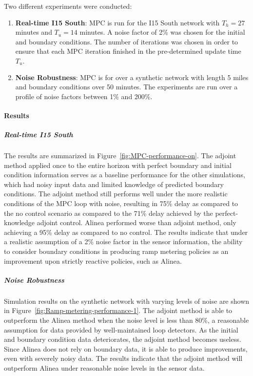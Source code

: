 Two different experiments were conducted:
\begin{enumerate}
\item \textbf{Real-time I15 South}: MPC is run for the I15 South network
with $T_{h}=27$ minutes and $T_{u}=14$ minutes. A noise factor of
2\% was chosen for the initial and boundary conditions. The number
of iterations was chosen in order to ensure that each MPC iteration
finished in the pre-determined update time $T_{u}$.
\item \textbf{Noise Robustness}: MPC is for over a synthetic network with
length 5 miles and boundary conditions over 50 minutes. The experiments
are run over a profile of noise factors between 1\% and 200\%.
\end{enumerate}

\paragraph{Results}


\subparagraph{Real-time I15 South}

The results are summarized in Figure~\ref{fig:MPC-performance-on}.
The adjoint method applied once to the entire horizon with perfect
boundary and initial condition information serves as a baseline performance
for the other simulations, which had noisy input data and limited
knowledge of predicted boundary conditions. The adjoint method still
performs well under the more realistic conditions of the MPC loop
with noise, resulting in 75\% delay as compared to the no control
scenario as compared to the 71\% delay achieved by the perfect-knowledge
adjoint control. Alinea performed worse than adjoint method, only
achieving a 95\% delay as compared to no control. The results indicate
that under a realistic assumption of a 2\% noise factor in the sensor
information, the ability to consider boundary conditions in producing
ramp metering policies as an improvement upon strictly reactive policies,
such as Alinea.

\begin{figure}
\hfill{}
\end{figure}



\subparagraph{Noise Robustness}

Simulation results on the synthetic network with varying levels of
noise are shown in Figure~\ref{fig:Ramp-metering-performance-1}.
The adjoint method is able to outperform the Alinea method when the
noise level is less than 80\%, a reasonable assumption for data provided
by well-maintained loop detectors. As the initial and boundary condition
data deteriorates, the adjoint method becomes useless. Since Alinea
does not rely on boundary data, it is able to produce improvements,
even with severely noisy data. The results indicate that the adjoint
method will outperform Alinea under reasonable noise levels in the
sensor data.
